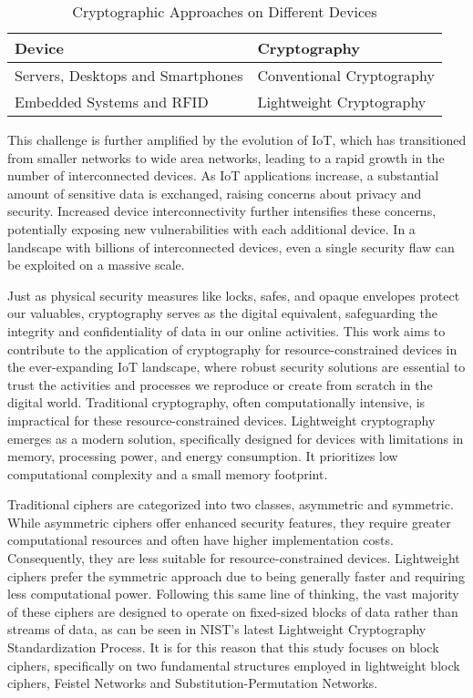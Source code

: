 \documentclass[conference]{IEEEtran}
\begin{document}
\begin{table}[ht]
    \centering
    \caption{Cryptographic Approaches on Different Devices}
    \begin{tabular}{ll}
        \toprule
        \textbf{Device} & \textbf{Cryptography} \\
        \midrule
        Servers, Desktops and Smartphones & Conventional Cryptography \\
        Embedded Systems and RFID & Lightweight Cryptography \\
        \bottomrule
    \end{tabular}
    \label{table:crypto_devices}
\end{table}

This challenge is further amplified by the evolution of IoT, which has transitioned from smaller networks to wide area networks, leading to a rapid growth in the number of interconnected devices. As IoT applications increase, a substantial amount of sensitive data is exchanged, raising concerns about privacy and security. Increased device interconnectivity further intensifies these concerns, potentially exposing new vulnerabilities with each additional device. In a landscape with billions of interconnected devices, even a single security flaw can be exploited on a massive scale.

Just as physical security measures like locks, safes, and opaque envelopes protect our valuables, cryptography serves as the digital equivalent, safeguarding the integrity and confidentiality of data in our online activities. This work aims to contribute to the application of cryptography for resource-constrained devices in the ever-expanding IoT landscape, where robust security solutions are essential to trust the activities and processes we reproduce or create from scratch in the digital world. 
Traditional cryptography, often computationally intensive, is impractical for these resource-constrained devices.  Lightweight cryptography emerges as a modern solution, specifically designed for devices with limitations in memory, processing power, and energy consumption. It prioritizes low computational complexity and a small memory footprint\cite{zhong2024lightweight}.

Traditional ciphers are categorized into two classes, asymmetric and symmetric. While asymmetric ciphers offer enhanced security features, they require greater computational resources and often have higher implementation costs. Consequently, they are less suitable for resource-constrained devices. Lightweight ciphers prefer the symmetric approach due to being generally faster and requiring less computational power. Following this same line of thinking, the vast majority of these ciphers are designed to operate on fixed-sized blocks of data rather than streams of data, as can be seen in NIST's latest Lightweight Cryptography Standardization Process\cite{NIST}. It is for this reason that this study focuses on block ciphers, specifically on two fundamental structures employed in lightweight block ciphers, Feistel Networks and Substitution-Permutation Networks.
\end{document}
